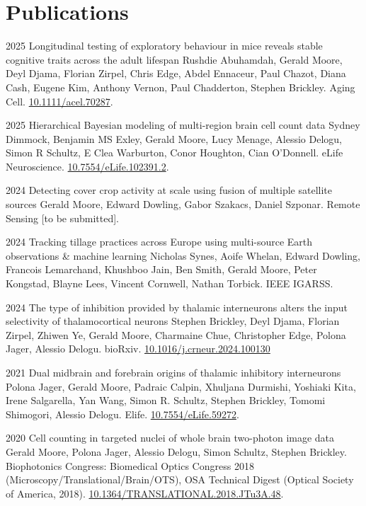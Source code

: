 \documentclass[9pt]{extarticle} %
\begin{document}


\section{Publications}

\publicationone
{2025}
{Longitudinal testing of exploratory behaviour in mice reveals stable cognitive traits across the adult lifespan}
{Rushdie Abuhamdah, Gerald Moore, Deyl Djama, Florian Zirpel, Chris Edge, Abdel Ennaceur, Paul Chazot, Diana Cash, Eugene Kim, Anthony Vernon, Paul Chadderton, Stephen Brickley. Aging Cell. \href{https://onlinelibrary.wiley.com/doi/10.1111/acel.70287}{10.1111/acel.70287}.}

\publicationone
{2025}
{Hierarchical Bayesian modeling of multi-region brain cell count data}
{Sydney Dimmock, Benjamin MS Exley, Gerald Moore, Lucy Menage, Alessio Delogu, Simon R Schultz, E Clea Warburton, Conor Houghton, Cian O'Donnell. eLife Neuroscience. \href{https://doi.org/10.7554/eLife.102391.1}{10.7554/eLife.102391.2}.}

\publicationone
{2024}
{Detecting cover crop activity at scale using fusion of multiple satellite sources}
{Gerald Moore, Edward Dowling, Gabor Szakacs, Daniel Szponar. Remote Sensing [to be submitted].}

\publicationone
{2024}
{Tracking tillage practices across Europe using multi-source Earth observations \& machine learning}
{Nicholas Synes, Aoife Whelan, Edward Dowling, Francois Lemarchand, Khushboo Jain, Ben Smith, Gerald Moore, Peter Kongstad, Blayne Lees, Vincent Cornwell, Nathan Torbick. IEEE IGARSS.}

\publicationtwo
{2024}
{The type of inhibition provided by thalamic interneurons alters the input selectivity of thalamocortical}
{neurons}
{Stephen Brickley, Deyl Djama, Florian Zirpel, Zhiwen Ye, Gerald Moore, Charmaine Chue, Christopher Edge, Polona Jager, Alessio Delogu. bioRxiv. \href{https://doi.org/10.1016/j.crneur.2024.100130}{10.1016/j.crneur.2024.100130}}

\publicationone
{2021}
{Dual midbrain and forebrain origins of thalamic inhibitory interneurons}
{Polona Jager, Gerald Moore, Padraic Calpin, Xhuljana Durmishi, Yoshiaki Kita, Irene Salgarella, Yan Wang, Simon R. Schultz, Stephen Brickley, Tomomi Shimogori, Alessio Delogu. Elife. \href{https://doi.org/10.7554/eLife.59272}{10.7554/eLife.59272}.}

\publicationone
{2020}
{Cell counting in targeted nuclei of whole brain two-photon image data}
{Gerald Moore, Polona Jager, Alessio Delogu, Simon Schultz, Stephen Brickley. Biophotonics Congress: Biomedical Optics Congress 2018 (Microscopy/Translational/Brain/OTS), OSA Technical Digest (Optical Society of America, 2018). \href{https://doi.org/10.1364/TRANSLATIONAL.2018.JTu3A.48}{10.1364/TRANSLATIONAL.2018.JTu3A.48}.}
\end{document}
